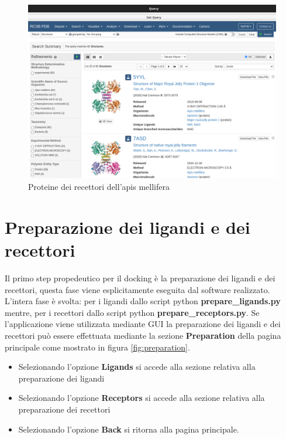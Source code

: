 \begin{figure}[H]
    \centering
    \includegraphics[scale=0.4]{immagini/fileRecettori.png}
    \caption{Proteine dei recettori dell'apis mellifera}
    \label{fig:fileRecettori}
\end{figure}

\section{Preparazione dei ligandi e dei recettori}\label{sec:3.4}
Il primo step propedeutico per il docking è la preparazione dei ligandi e dei recettori, questa
fase viene esplicitamente eseguita dal software realizzato. L'intera fase è svolta: per i ligandi dallo script python \textbf{prepare\_ligands.py} mentre, per i recettori dallo script python \textbf{prepare\_receptors.py}. Se l'applicazione viene utilizzata mediante GUI la preparazione dei ligandi e dei recettori può essere effettuata mediante la sezione \textbf{Preparation} della pagina principale come mostrato in figura \ref{fig:preparation}.

\begin{itemize}
    \item Selezionando l'opzione \textbf{Ligands} si accede alla sezione relativa alla preparazione dei ligandi
    \item Selezionando l'opzione \textbf{Receptors} si accede alla sezione relativa alla preparazione dei recettori
    \item Selezionando l'opzione \textbf{Back} si ritorna alla pagina principale.
\end{itemize}


